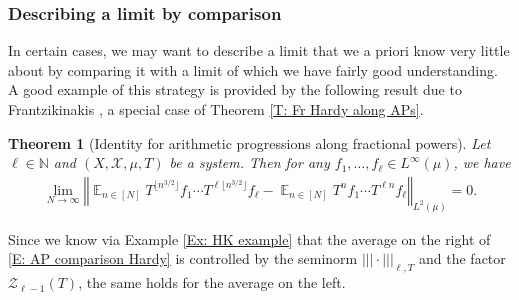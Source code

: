 \documentclass[11pt]{amsart}
\newtheorem{theorem}[lemma]{Theorem}
\theoremstyle{definition}
\DeclareMathOperator*{\E}{\mathbb{E}}
\newcommand{\N}{{\mathbb N}}
\newcommand{\CX}{{\mathcal X}}
\newcommand{\CZ}{{\mathcal Z}}
\newcommand{\norm}[1]{\left\Vert #1\right\Vert}
\newcommand{\nnorm}[1]{\lvert\!|\!| #1|\!|\!\rvert}
\newcommand{\1}{{\mathbf{1}}}
\newcommand{\sfloor}[1]{{\lfloor #1 \rfloor}}
\begin{document}
\subsubsection{Describing a limit by comparison}\label{SSS: limit by comparison}
In certain cases, we may want to describe a limit that we a priori know very little about by comparing it with a limit of which we have fairly good understanding. A good example of this strategy is provided by the following result due to Frantzikinakis \cite{Fr10}, a special case of Theorem \ref{T: Fr Hardy along APs}.
\begin{theorem}[Identity for arithmetic progressions along fractional powers]
Let $\ell\in \N$ and $(X, \CX, \mu, T)$ be a system. Then for any $f_1, \ldots, f_\ell\in L^\infty(\mu)$, we have
\begin{align}\label{E: AP comparison Hardy}
\lim_{N\to\infty}\norm{\E_{n\in[N]} T^{\sfloor{n^{3/2}}} f_1 \cdots T^{\ell \sfloor{n^{3/2}}} f_\ell-\E_{n\in[N]} T^n f_1 \cdots T^{\ell n} f_\ell}_{L^2(\mu)}  = 0.
\end{align}
\end{theorem}
Since we know via Example \ref{Ex: HK example} that the average on the right of \eqref{E: AP comparison Hardy} is controlled by the seminorm $\nnorm{\cdot}_{\ell, T}$ and the factor $\CZ_{\ell-1}(T)$, the same holds for the average on the left. 
\end{document}

